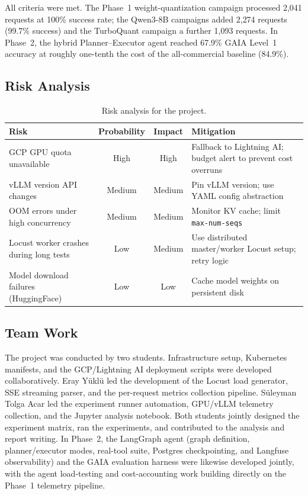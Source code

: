 \documentclass[a4paper,12pt]{report}
\begin{document}
All criteria were met. The Phase~1 weight-quantization campaign processed 2{,}041 requests at 100\% success rate; the Qwen3-8B campaigns added 2{,}274 requests (99.7\% success) and the TurboQuant campaign a further 1{,}093 requests. In Phase~2, the hybrid Planner--Executor agent reached 67.9\% GAIA Level~1 accuracy at roughly one-tenth the cost of the all-commercial baseline (84.9\%).

\subsection{Risk Analysis}

\begin{table}[h!]
\caption{Risk analysis for the project.}
\centering
\begin{tabular}{|p{4.5cm}|c|c|p{5cm}|}
\hline
\textbf{Risk} & \textbf{Probability} & \textbf{Impact} & \textbf{Mitigation} \\
\hline
GCP GPU quota unavailable & High & High & Fallback to Lightning AI; budget alert to prevent cost overruns \\
\hline
vLLM version API changes & Medium & Medium & Pin vLLM version; use YAML config abstraction \\
\hline
OOM errors under high concurrency & Medium & Medium & Monitor KV cache; limit \texttt{max-num-seqs} \\
\hline
Locust worker crashes during long tests & Low & Medium & Use distributed master/worker Locust setup; retry logic \\
\hline
Model download failures (HuggingFace) & Low & Low & Cache model weights on persistent disk \\
\hline
\end{tabular}
\label{table:risks}
\end{table}

\subsection{Team Work}

The project was conducted by two students. Infrastructure setup, Kubernetes manifests, and the GCP/Lightning AI deployment scripts were developed collaboratively. Eray Y\"{u}kl\"{u} led the development of the Locust load generator, SSE streaming parser, and the per-request metrics collection pipeline. S\"{u}leyman Tolga Acar led the experiment runner automation, GPU/vLLM telemetry collection, and the Jupyter analysis notebook. Both students jointly designed the experiment matrix, ran the experiments, and contributed to the analysis and report writing. In Phase~2, the LangGraph agent (graph definition, planner/executor modes, real-tool suite, Postgres checkpointing, and Langfuse observability) and the GAIA evaluation harness were likewise developed jointly, with the agent load-testing and cost-accounting work building directly on the Phase~1 telemetry pipeline.
\end{document}
